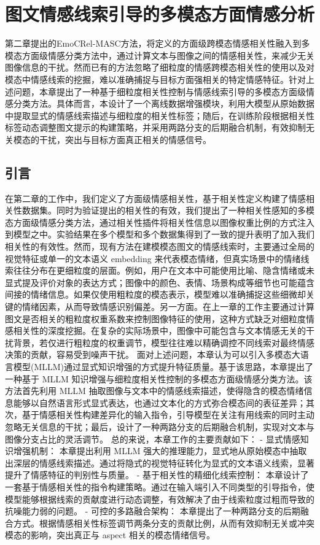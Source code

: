 \chapter{图文情感线索引导的多模态方面情感分析}

第二章提出的EmoCRel-MASC方法，将定义的方面级跨模态情感相关性融入到多模态方面级情感分类方法中，通过计算文本与图像之间的情感相关性，来减少无关图像信息的干扰。然而已有的方法忽略了细粒度的情感跨模态相关性的使用以及对模态中情感线索的挖掘，难以准确捕捉与目标方面强相关的特定情感特征。针对上述问题，本章提出了一种基于细粒度相关性控制与情感线索引导的多模态方面级情感分类方法。具体而言，本设计了一个离线数据增强模块，利用大模型从原始数据中提取显式的情感线索描述与细粒度的相关性标签；随后，在训练阶段根据相关性标签动态调整图文提示的构建策略，并采用两路分支的后期融合机制，有效抑制无关模态的干扰，突出与目标方面真正相关的情感信号。

\section{引言}
在第二章的工作中，我们定义了方面级情感相关性，基于相关性定义构建了情感相关性数据集。同时为验证提出的相关性的有效，我们提出了一种相关性感知的多模态方面级情感分类方法，通过相关性插件将相关性信息以图像权重比例的方式注入到模型之中。实验结果在多个模型和多个数据集得到了一致的提升表明了加入我们相关性的有效性。然而，现有方法在建模模态图文的情感线索时，主要通过全局的视觉特征或单一的文本语义 embedding 来代表模态情绪，但真实场景中的情绪线索往往分布在更细粒度的层面。例如，用户在文本中可能使用比喻、隐含情绪或未显式提及评价对象的表达方式；图像中的颜色、表情、场景构成等细节也可能蕴含间接的情绪信息。如果仅使用粗粒度的模态表示，模型难以准确捕捉这些细微却关键的情绪因素，从而导致情感识别偏差。另一方面。在上一章的工作主要通过计算图文是否相关的粗粒度权重系数来控制图像特征的使用，这种方式缺乏对细粒度情感相关性的深度挖掘。在复杂的实际场景中，图像中可能包含与文本情感无关的干扰背景，若仅进行粗粒度的权重调节，模型往往难以精确调控不同线索对最终情感决策的贡献，容易受到噪声干扰。
面对上述问题，本章认为可以引入多模态大语言模型(MLLM)通过显式知识增强的方式提升特征质量。基于该思路，本章提出了一种基于 MLLM 知识增强与细粒度相关性控制的多模态方面级情感分类方法。该方法首先利用 MLLM 抽取图像与文本中的情感线索描述，使得隐含的模态情绪信息能够以自然语言形式显式表达，也通过文本化的方式弥合模态间的表征差异；其次，基于情感相关性构建差异化的输入指令，引导模型在关注有用线索的同时主动忽略无关信息的干扰；最后，设计了一种两路分支的后期融合机制，实现对文本与图像分支占比的灵活调节。
总的来说，本章工作的主要贡献如下：
- 显式情感知识增强机制： 本章提出利用 MLLM 强大的推理能力，显式地从原始模态中抽取出深层的情感线索描述。通过将隐式的视觉特征转化为显式的文本语义线索，显著提升了情感特征的判别性与质量。
- 基于相关性的精细化线索控制： 本章设计了一套基于情感相关性的指令构建策略。通过在输入端引入不同类型的引导指令，使模型能够根据线索的贡献度进行动态调整，有效解决了由于线索粒度过粗而导致的抗噪能力弱的问题。
- 可控的多路融合架构： 本章提出了一种两路分支的后期融合方式。根据情感相关性标签调节两条分支的贡献比例，从而有效抑制无关或冲突模态的影响，突出真正与 aspect 相关的模态情绪信号。

